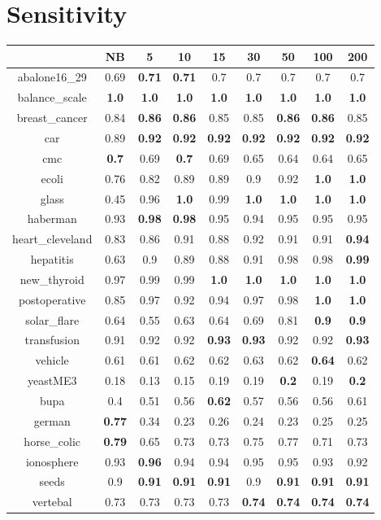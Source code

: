 \documentclass{article}%
\begin{document}
%
\section*{Sensitivity}%
\begin{tabular}{c|cccccccc}%
\hline%
&NB&5&10&15&30&50&100&200\\%
\hline%
abalone16\_29&0.69&\textbf{0.71}&\textbf{0.71}&0.7&0.7&0.7&0.7&0.7\\%
\hline%
balance\_scale&\textbf{1.0}&\textbf{1.0}&\textbf{1.0}&\textbf{1.0}&\textbf{1.0}&\textbf{1.0}&\textbf{1.0}&\textbf{1.0}\\%
\hline%
breast\_cancer&0.84&\textbf{0.86}&\textbf{0.86}&0.85&0.85&\textbf{0.86}&\textbf{0.86}&0.85\\%
\hline%
car&0.89&\textbf{0.92}&\textbf{0.92}&\textbf{0.92}&\textbf{0.92}&\textbf{0.92}&\textbf{0.92}&\textbf{0.92}\\%
\hline%
cmc&\textbf{0.7}&0.69&\textbf{0.7}&0.69&0.65&0.64&0.64&0.65\\%
\hline%
ecoli&0.76&0.82&0.89&0.89&0.9&0.92&\textbf{1.0}&\textbf{1.0}\\%
\hline%
glass&0.45&0.96&\textbf{1.0}&0.99&\textbf{1.0}&\textbf{1.0}&\textbf{1.0}&\textbf{1.0}\\%
\hline%
haberman&0.93&\textbf{0.98}&\textbf{0.98}&0.95&0.94&0.95&0.95&0.95\\%
\hline%
heart\_cleveland&0.83&0.86&0.91&0.88&0.92&0.91&0.91&\textbf{0.94}\\%
\hline%
hepatitis&0.63&0.9&0.89&0.88&0.91&0.98&0.98&\textbf{0.99}\\%
\hline%
new\_thyroid&0.97&0.99&0.99&\textbf{1.0}&\textbf{1.0}&\textbf{1.0}&\textbf{1.0}&\textbf{1.0}\\%
\hline%
postoperative&0.85&0.97&0.92&0.94&0.97&0.98&\textbf{1.0}&\textbf{1.0}\\%
\hline%
solar\_flare&0.64&0.55&0.63&0.64&0.69&0.81&\textbf{0.9}&\textbf{0.9}\\%
\hline%
transfusion&0.91&0.92&0.92&\textbf{0.93}&\textbf{0.93}&0.92&0.92&\textbf{0.93}\\%
\hline%
vehicle&0.61&0.61&0.62&0.62&0.63&0.62&\textbf{0.64}&0.62\\%
\hline%
yeastME3&0.18&0.13&0.15&0.19&0.19&\textbf{0.2}&0.19&\textbf{0.2}\\%
\hline%
bupa&0.4&0.51&0.56&\textbf{0.62}&0.57&0.56&0.56&0.61\\%
\hline%
german&\textbf{0.77}&0.34&0.23&0.26&0.24&0.23&0.25&0.25\\%
\hline%
horse\_colic&\textbf{0.79}&0.65&0.73&0.73&0.75&0.77&0.71&0.73\\%
\hline%
ionosphere&0.93&\textbf{0.96}&0.94&0.94&0.95&0.95&0.93&0.92\\%
\hline%
seeds&0.9&\textbf{0.91}&\textbf{0.91}&\textbf{0.91}&0.9&\textbf{0.91}&\textbf{0.91}&\textbf{0.91}\\%
\hline%
vertebal&0.73&0.73&0.73&0.73&\textbf{0.74}&\textbf{0.74}&\textbf{0.74}&\textbf{0.74}\\%
\hline%
\end{tabular}
\end{document}
